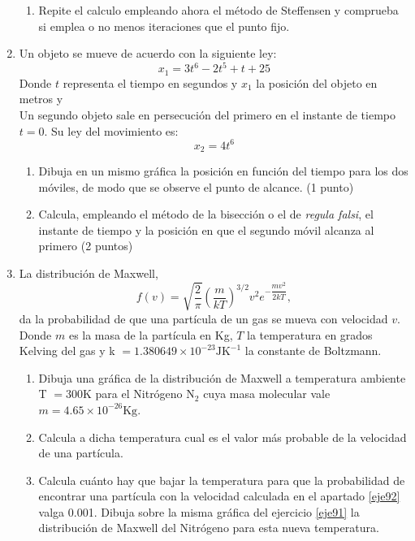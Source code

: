 \begin{enumerate}
\begin{enumerate}
\item Repite el calculo empleando ahora el método de Steffensen y comprueba si emplea o no menos iteraciones que el punto fijo.
\end{enumerate}

\item Un objeto se mueve de acuerdo con la siguiente ley:
\begin{equation}
x_1 = 3t^6 - 2t^5 + t + 25
\end{equation}
Donde  $t$ representa el tiempo en segundos y $x_1$ la posición del objeto en metros y \\
 Un segundo objeto sale en persecución del primero en el instante de tiempo $t=0$. Su ley del movimiento es:
\begin{equation}
x_2 = 4t^6
\end{equation}
\begin{enumerate}
\item Dibuja en un mismo gráfica la posición en función del tiempo para los dos móviles, de modo que se observe el punto de alcance. (1 punto) 
\item Calcula, empleando el método de la bisección o el de \emph{regula falsi},  el instante de tiempo y la posición en que el segundo móvil alcanza al primero (2 puntos)
\end{enumerate}

\item La distribución de Maxwell, 
\begin{equation}
f(v) = \sqrt{\frac{2}{\pi}}\left( \frac{m}{kT}\right)^{3/2}v^2e^{-\dfrac{\scriptstyle mv^2}{\scriptstyle 2kT}},
\end{equation}
da la probabilidad de que una partícula de un gas se mueva con velocidad $v$. Donde $m$ es la masa de la partícula en Kg, $T$ la temperatura en grados Kelving del gas y k $=1.380649\times 10^{-23} \text{JK}^{-1}$ la constante de Boltzmann. 
\begin{enumerate}
\item  \label{eje91}Dibuja una gráfica de la distribución de Maxwell a temperatura ambiente T $= 300$K para el Nitrógeno N$_2$  cuya masa molecular vale $m = 4.65 \times 10^{-26}	\text{Kg}$.
\item \label{eje92}Calcula a dicha temperatura cual es el valor más probable de la velocidad de una partícula.
\item Calcula cuánto hay que bajar la temperatura para que la probabilidad de encontrar una partícula con la velocidad calculada en el apartado \ref{eje92} valga 0.001. Dibuja sobre la misma gráfica del ejercicio \ref{eje91} la distribución de Maxwell del Nitrógeno para esta nueva temperatura. 

\end{enumerate}

\end{enumerate}

